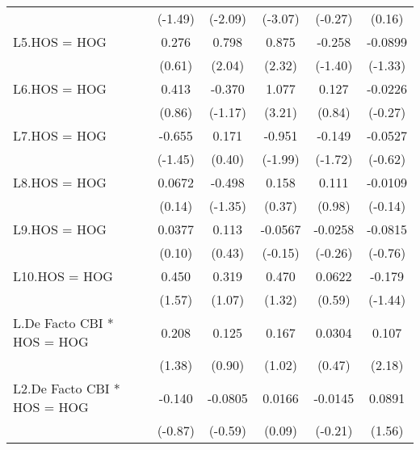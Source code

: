 {\begin{longtable}{l*{5}{c}}
                &  (-1.49)         &  (-2.09)         &  (-3.07)         &  (-0.27)         &   (0.16)         \\
[1em]
L5.HOS = HOG    &    0.276         &    0.798\sym{*}  &    0.875\sym{*}  &   -0.258         &  -0.0899         \\
                &   (0.61)         &   (2.04)         &   (2.32)         &  (-1.40)         &  (-1.33)         \\
[1em]
L6.HOS = HOG    &    0.413         &   -0.370         &    1.077\sym{**} &    0.127         &  -0.0226         \\
                &   (0.86)         &  (-1.17)         &   (3.21)         &   (0.84)         &  (-0.27)         \\
[1em]
L7.HOS = HOG    &   -0.655         &    0.171         &   -0.951\sym{*}  &   -0.149         &  -0.0527         \\
                &  (-1.45)         &   (0.40)         &  (-1.99)         &  (-1.72)         &  (-0.62)         \\
[1em]
L8.HOS = HOG    &   0.0672         &   -0.498         &    0.158         &    0.111         &  -0.0109         \\
                &   (0.14)         &  (-1.35)         &   (0.37)         &   (0.98)         &  (-0.14)         \\
[1em]
L9.HOS = HOG    &   0.0377         &    0.113         &  -0.0567         &  -0.0258         &  -0.0815         \\
                &   (0.10)         &   (0.43)         &  (-0.15)         &  (-0.26)         &  (-0.76)         \\
[1em]
L10.HOS = HOG   &    0.450         &    0.319         &    0.470         &   0.0622         &   -0.179         \\
                &   (1.57)         &   (1.07)         &   (1.32)         &   (0.59)         &  (-1.44)         \\
[1em]
L.De Facto CBI * HOS = HOG&    0.208         &    0.125         &    0.167         &   0.0304         &    0.107\sym{*}  \\
                &   (1.38)         &   (0.90)         &   (1.02)         &   (0.47)         &   (2.18)         \\
[1em]
L2.De Facto CBI * HOS = HOG&   -0.140         &  -0.0805         &   0.0166         &  -0.0145         &   0.0891         \\
                &  (-0.87)         &  (-0.59)         &   (0.09)         &  (-0.21)         &   (1.56)         \\

\end{longtable}}
